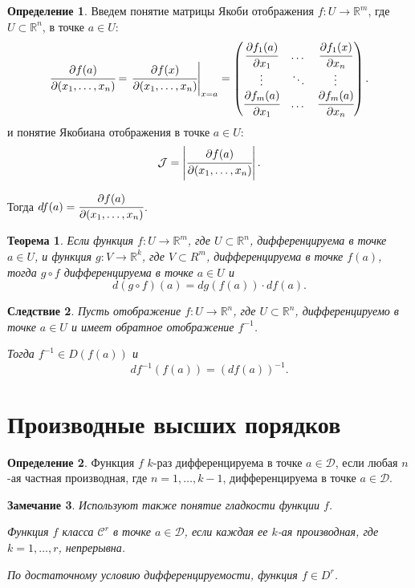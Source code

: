 \documentclass[oneside, final]{book}
\newcommand{\mbb}[1]{\mathbb{#1}}
\newcommand{\mcl}[1]{\mathcal{#1}}
\theoremstyle{plain}
\newtheorem{theorem}{Теорема}[chapter]
\newtheorem{corollary}[theorem]{Следствие}
\newtheorem{remark}[theorem]{Замечание}
\theoremstyle{definition}
\newtheorem{mdef}{Определение}[chapter]
\begin{document}
	\begin{mdef}
		Введем понятие матрицы Якоби отображения $f\colon U \to \mbb R^m$, где $U \subset \mbb R^n$, в точке $a\in U$:
		$$
			\cfrac {\partial f(a)} {\partial(x_1, \ldots, x_n)} = \left. \cfrac {\partial f(x)} {\partial(x_1, \ldots, x_n)} \right|_{x=a} = \begin{pmatrix}
				\cfrac {\partial f_1(a)} {\partial x_1} & \dots & \cfrac {\partial f_1(x)} {\partial x_n} \\
				\vdots & \ddots & \vdots \\
				\cfrac {\partial f_m(a)} {\partial x _1} & \dots & \cfrac {\partial f_m(a)} {\partial x_n}
			\end{pmatrix}.
		$$
		и понятие Якобиана отображения в точке $a \in U$:
		$$
			\mcl J = \left|  \cfrac {\partial f(a)} {\partial(x_1, \ldots, x_n)}  \right|.
		$$
	
		Тогда $df(a) = \cfrac {\partial f(a)} {\partial(x_1, \ldots, x_n)}$.
	\end{mdef}
	
	\begin{theorem}
		Если функция $f\colon U \to \mbb R^m$, где $U \subset \mbb R^n$, дифференцируема в точке $a\in U$, и функция $g \colon V \to \mbb R^k$, где $V \subset R^m$, дифференцируема в точке $f(a)$, тогда
		$g \circ f$ дифференцируема в точке $a \in U$ и 
		$$
			d(g \circ f)(a) = dg(f(a))\cdot df(a).
		$$
	\end{theorem}
	\begin{corollary}
		Пусть отображение $f\colon U \to \mbb R^n$, где $U \subset \mbb R^n$, дифференцируемо в точке $a\in U$ и  имеет обратное отображение $f^{-1}$.
		
		Тогда $f^{-1} \in D(f(a))$ и 
		$$
			df^{-1}(f(a)) = (df(a))^{-1}.
		$$
	\end{corollary}
	
	
	\section{Производные высших порядков}
	\begin{mdef}
		Функция $f$ $k$-раз дифференцируема в точке $a \in \mcl D$, если любая $n$-ая частная производная, где $n=1,\ldots,k-1$, дифференцируема в точке $a \in \mcl D$.
	\end{mdef}
	\begin{remark}
		Используют также понятие гладкости функции $f$. 
		
		Функция $f$ класса $\mcl C^r$ в точке $a\in \mcl D$, если каждая ее $k$-ая производная, где $k=1,\ldots,r$, непрерывна.
		
		По достаточному условию дифференцируемости, функция $f \in D^{r}$.
	\end{remark}
\end{document}
